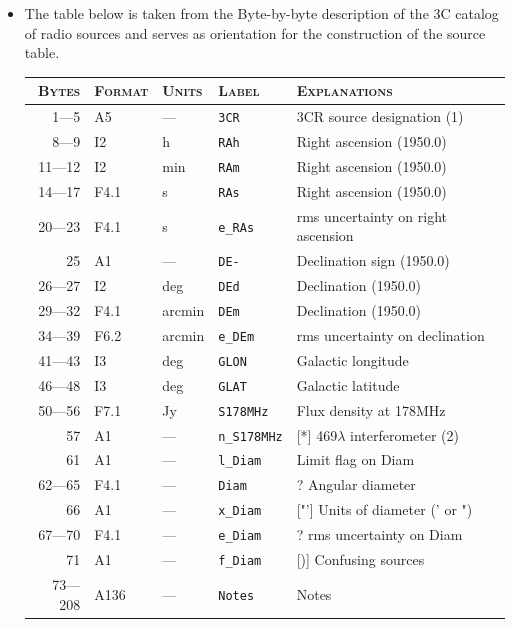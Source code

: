 \documentclass[a4paper,10pt,bibtotoc]{scrartcl}
\begin{document}
\begin{itemize}
\item The table below is taken from the Byte-by-byte description of the 3C catalog of radio sources and serves as orientation for the construction of the source table.
  \begin{center}
    \begin{tabular}{rllll}
      \hline
      \textsc{Bytes} & \textsc{Format} & \textsc{Units} & \textsc{Label} & \textsc{Explanations} \\
      \hline \hline
      1---5    & A5   & ---    & \verb|3CR|       & 3CR source designation (1) \\
      8---9    & I2   & h      & \verb|RAh|       & Right ascension (1950.0) \\
      11---12  & I2   & min    & \verb|RAm|       & Right ascension (1950.0) \\
      14---17  & F4.1 & s      & \verb|RAs|       & Right ascension (1950.0) \\
      20---23  & F4.1 & s      & \verb|e_RAs|     & rms uncertainty on right ascension \\
      25       & A1   & ---    & \verb|DE-|       & Declination sign (1950.0) \\
      26---27  &  I2  & deg    & \verb|DEd|       & Declination (1950.0)  \\
      29---32  & F4.1 & arcmin & \verb|DEm|       & Declination (1950.0)  \\
      34---39  & F6.2 & arcmin & \verb|e_DEm|     & rms uncertainty on declination  \\
      41---43  & I3   & deg    & \verb|GLON|      & Galactic longitude  \\
      46---48  & I3   & deg    & \verb|GLAT|      & Galactic latitude  \\
      50---56  & F7.1 & Jy     & \verb|S178MHz|   & Flux density at 178MHz  \\
      57       & A1   & ---    & \verb|n_S178MHz| & [*] 469$\lambda$ interferometer (2)  \\
      61       & A1   & ---    & \verb|l_Diam|    & Limit flag on Diam  \\
      62---65  & F4.1 & ---    & \verb|Diam|      & ? Angular diameter  \\
      66       & A1   & ---    & \verb|x_Diam|    & ["'] Units of diameter (' or ")  \\
      67---70  & F4.1 & ---    & \verb|e_Diam|    & ? rms uncertainty on Diam  \\
      71       & A1   & ---    & \verb|f_Diam|    & [)] Confusing sources  \\
      73---208 & A136 & ---    & \verb|Notes|     & Notes  \\
      \hline
    \end{tabular}
  \end{center}
\end{itemize}
\end{document}
